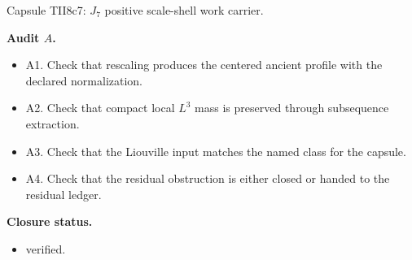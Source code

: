 \documentclass[11pt]{amsart}
\newcommand{\capsulefield}[1]{\par\smallskip\noindent\textbf{#1.}\ }
\begin{document}
\begin{proofcapsule}{Capsule TII8c7: $J_7$ positive scale-shell work carrier.}
  \capsulefield{Audit \(A\)}
  \begin{itemize}[leftmargin=1.8em]
  \item A1. Check that rescaling produces the centered ancient profile with the declared normalization.
  \item A2. Check that compact local $L^3$ mass is preserved through subsequence extraction.
  \item A3. Check that the Liouville input matches the named class for the capsule.
  \item A4. Check that the residual obstruction is either closed or handed to the residual ledger.
  \end{itemize}
  \capsulefield{Closure status}
  \begin{itemize}[leftmargin=1.8em]
  \item verified.
  \end{itemize}
\end{proofcapsule}
\end{document}
